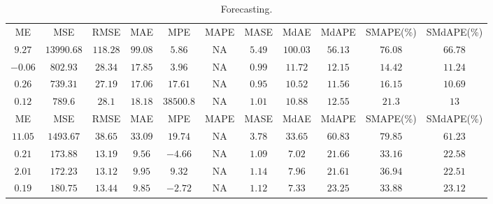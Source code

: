 \begin{table}
{\begin{tabular}{|c|c|c|c|c|c|c|c|c|c|c|}
ME &MSE &RMSE &MAE &MPE &MAPE &MASE &MdAE &MdAPE & SMAPE(\%) & SMdAPE(\%) \\
$9.27$ & $13990.68$ & $118.28$ & $99.08$ & $5.86$ & N\/A &$5.49$ & $100.03$ & $56.13$ & $76.08$ & $66.78$ \\
\bf{$-0.06$} & $802.93$ & $28.34$ & $17.85$ & \bf{$3.96$} & N\/A &$0.99$ & $11.72$ & $12.15$ & \bf{$14.42$} & $11.24$ \\
$0.26$ & \bf{$739.31$} & \bf{$27.19$} & \bf{$17.06$} & $17.61$ & N\/A &\bf{$0.95$} & \bf{$10.52$} & \bf{$11.56$} & $16.15$ & \bf{$10.69$} \\
$0.12$ & $789.6$ & $28.1$ & $18.18$ & $38500.8$ & N\/A &$1.01$ & $10.88$ & $12.55$ & $21.3$ & $13$ \\

ME &MSE &RMSE &MAE &MPE &MAPE &MASE &MdAE &MdAPE & SMAPE(\%) & SMdAPE(\%) \\
$11.05$ & $1493.67$ & $38.65$ & $33.09$ & $19.74$ & N\/A &$3.78$ & $33.65$ & $60.83$ & $79.85$ & $61.23$ \\
$0.21$ & $173.88$ & $13.19$ & \bf{$9.56$} & \bf{$-4.66$} & N\/A & \bf{$1.09$} & \bf{$7.02$} & $21.66$ & \bf{$33.16$} & $22.58$ \\
$2.01$ & \bf{$172.23$} & \bf{$13.12$} & $9.95$ & $9.32$ & N\/A & $1.14$ & $7.96$ & \bf{$21.61$} & $36.94$ & \bf{$22.51$} \\
\bf{$0.19$} & $180.75$ & $13.44$ & $9.85$ & $-2.72$ & N\/A & $1.12$ & $7.33$ & $23.25$ & $33.88$ & $23.12$ \\
\hline
\end{tabular}
}
\caption{Forecasting.}
\label{tab:forecasting}
\end{table}
